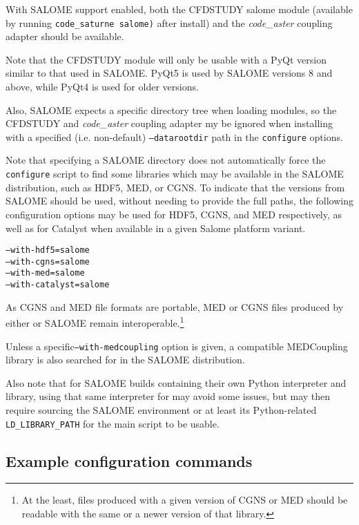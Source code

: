 \documentclass[a4paper,10pt,twoside]{csshortdoc}
\begin{document}
With SALOME support enabled, both the CFDSTUDY salome module
(available by running \texttt{code\_saturne salome)} after install)
and the \textit{code\_aster} coupling adapter should be available.

Note that the CFDSTUDY module will only be usable with a PyQt
version similar to that used in SALOME. PyQt5 is used by SALOME
versions 8 and above, while PyQt4 is used for older versions.

Also, SALOME expects a specific directory tree when loading modules,
so the CFDSTUDY and \textit{code\_aster} coupling adapter my be
ignored when installing with a specified (i.e. non-default)
\texttt{--datarootdir} path in the \CS \texttt{configure} options.

Note that specifying a SALOME directory does not automatically
force the \CS \texttt{configure} script to find some libraries
which may be available in the SALOME distribution, such as HDF5,
MED, or CGNS. To indicate that the versions from SALOME should be used,
without needing to provide the full paths, the following configuration
options may be used for HDF5, CGNS, and MED respectively, as well
as for Catalyst when available in a given Salome platform variant.

 \texttt{--with-hdf5=salome}\\
 \texttt{--with-cgns=salome}\\
 \texttt{--with-med=salome}\\
 \texttt{--with-catalyst=salome}

As CGNS and MED file formats are portable, MED or CGNS files produced
by either \CS or SALOME remain interoperable.\footnote{At the least,
files produced with a given version of CGNS or MED should be readable
with the same or a newer version of that library.}

Unless a specific\texttt{--with-medcoupling} option is given, a compatible
MEDCoupling library is also searched for in the SALOME distribution.

Also note that for SALOME builds containing their own Python interpreter and library,
using that same interpreter for \CS may avoid some issues, but may then require
sourcing the SALOME environment or at least its Python-related
\texttt{LD\_LIBRARY\_PATH} for the main \CS script to be usable.

\subsection{Example configuration commands\label{sec:config:examples}}
\end{document}
